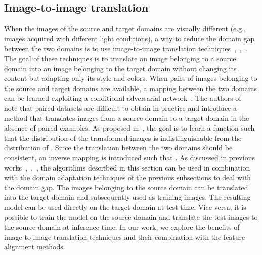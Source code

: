 \documentclass[preprint]{elsarticle}
\begin{document}
\subsection{Image-to-image translation}
When the images of the source and target domains are visually different (e.g., images acquired with different light conditions), a way to reduce the domain gap between the two domains is to use image-to-image translation techniques~\cite{Anoosheh_2019},~\cite{Murez_2018},~\cite{gonzalezgarcia2018imagetoimage}. The goal of these techniques is to translate an image belonging to a source domain into an image belonging to the target domain without changing its content but adapting only its style and colors. When pairs of images belonging to the source and target domains are available, a mapping between the two domains can be learned exploiting a conditional adversarial network~\cite{Isola_2017}. The authors of~\cite{CycleGAN2017} note that paired datasets are difficult to obtain in practice and introduce a method that translates images from a source domain  to a target domain  in the absence of paired examples. As proposed in~\cite{CycleGAN2017}, the goal is to learn a function  such that the distribution of the transformed images   is indistinguishable from the distribution of . Since the translation between the two domains should be consistent, an inverse mapping  is introduced such that .
\newline
As discussed in previous works~\cite{hoffman2017cycada},~\cite{Saito_2019},~\cite{kim2019diversify}, the algorithms described in this section can be used in combination with the domain adaptation techniques of the previous subsections to deal with the domain gap. The images belonging to the source domain can be translated into the target domain and subsequently used as training images. The resulting model can be used directly on the target domain at test time. Vice versa, it is possible to train the model on the source domain and translate the test images to the source domain at inference time.
\newline
In our work, we explore the benefits of image to image translation techniques and their combination with the feature alignment methods.
\end{document}
